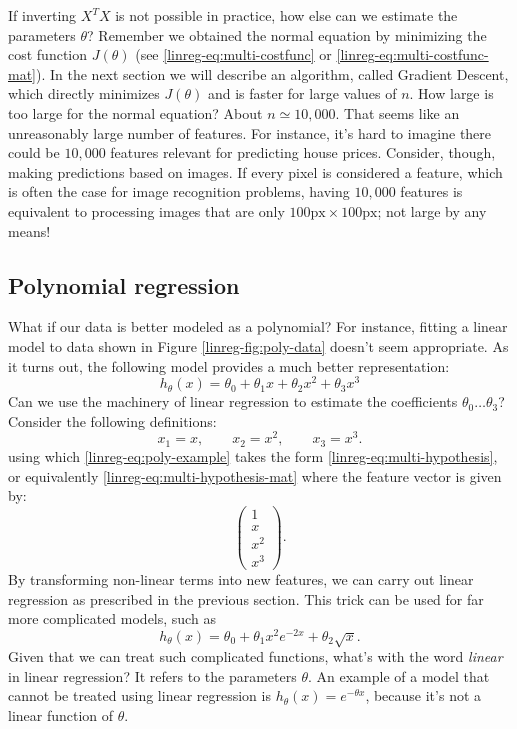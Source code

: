 \documentclass{article}
\theoremstyle{definition}
\begin{document}
If inverting $X^TX$ is not possible in practice, how else can we estimate the parameters $\theta$? Remember we obtained the normal equation by minimizing the cost function $J(\theta)$ (see \eqref{linreg-eq:multi-costfunc} or \eqref{linreg-eq:multi-costfunc-mat}). In the next section we will describe an algorithm, called Gradient Descent, which directly minimizes $J(\theta)$ and is faster for large values of $n$. How large is too large for the normal equation? About $n\simeq10,000$. That seems like an unreasonably large number of features. For instance, it's hard to imagine there could be $10,000$ features relevant for predicting house prices. Consider, though, making predictions based on images. If every pixel is considered a feature, which is often the case for image recognition problems, having $10,000$ features is equivalent to processing images that are only $100\text{px}\times100\text{px}$; not large by any means!


\subsection{Polynomial regression}
What if our data is better modeled as a polynomial? For instance, fitting a linear model to data shown in Figure \ref{linreg-fig:poly-data} doesn't seem appropriate. As it turns out, the following model provides a much better representation:
\begin{equation}
h_\theta(x) = \theta_0 + \theta_1 x + \theta_2 x^2 + \theta_3 x^3
\label{linreg-eq:poly-example}
\end{equation}
Can we use the machinery of linear regression to estimate the coefficients $\theta_0\dots\theta_3$? Consider the following definitions:
\begin{equation}
    x_1 = x, \qquad x_2 = x^2, \qquad x_3 = x^3.
\end{equation}
using which \eqref{linreg-eq:poly-example} takes the form \eqref{linreg-eq:multi-hypothesis}, or equivalently \eqref{linreg-eq:multi-hypothesis-mat} where the feature vector is given by:
\begin{equation*}
    \begin{pmatrix}
        1 \\
        x \\
        x^2 \\
        x^3
    \end{pmatrix}.
\end{equation*}
By transforming non-linear terms into new features, we can carry out linear regression as prescribed in the previous section. This trick can be used for far more complicated models, such as
\begin{equation}
    h_{\theta}(x) = \theta_0 + \theta_1 x^2 e^{-2x} + \theta_2 \sqrt{x}.
\end{equation}
Given that we can treat such complicated functions, what's with the word \textit{linear} in linear regression? It refers to the parameters $\theta$. An example of a model that cannot be treated using linear regression is $h_{\theta}(x) = e^{-\theta x}$, because it's not a linear function of $\theta$.
\end{document}
